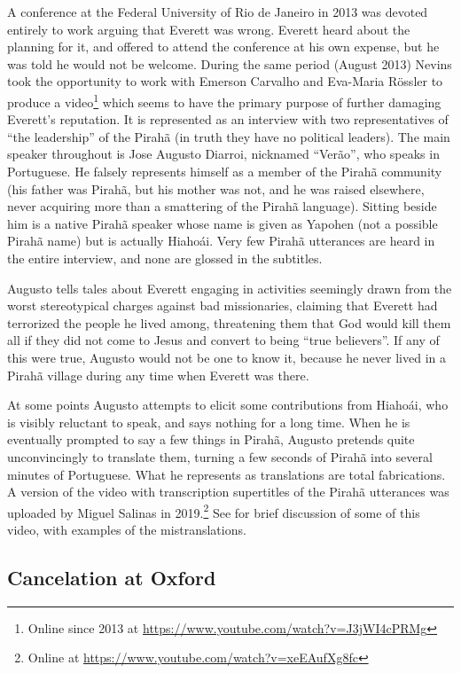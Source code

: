 \documentclass[output=paper,colorlinks,citecolor=brown
]{langscibook}
\begin{document}
A conference at the Federal University of Rio de Janeiro in 2013 was
devoted entirely to work arguing that Everett was wrong. Everett heard
about the planning for it, and offered to attend the conference at
his own expense, but he was told he would not be welcome. During the
same period (August 2013) Nevins took the opportunity to work with
Emerson Carvalho and Eva-Maria R{\"o}ssler to produce a video\footnote{%
   Online since 2013 at
   \url{https://www.youtube.com/watch?v=J3jWI4cPRMg}}
which seems to have the primary purpose of further damaging Everett's
reputation. It is represented as an interview with two representatives
of ``the leadership'' of the Pirahã (in truth they have no political
leaders). The main speaker throughout is Jose Augusto Diarroi, nicknamed
``Ver{ã}o'', who speaks in Portuguese. He falsely represents himself as a
member of the Pirahã community (his father was Pirahã, but
his mother was not, and he was raised elsewhere, never acquiring
more than a smattering of the Pirahã language). Sitting beside
him is a native Pirahã speaker whose name is given as Yapohen
(not a possible Pirahã name) but is actually Hiaho{\'a}i. Very
few Pirahã utterances are heard in the entire interview, and none
are glossed in the subtitles.

Augusto tells tales about Everett engaging in activities seemingly
drawn from the worst stereotypical charges against bad missionaries,
claiming that Everett had terrorized the people he lived among,
threatening them that God would kill them all if they did not come
to Jesus and convert to being ``true believers''. If any of this were
true, Augusto would not be one to know it, because he never lived in
a Pirahã village during any time when Everett was there.

At some points Augusto attempts to elicit some contributions from
Hiaho{\'a}i, who is visibly reluctant to speak, and says nothing for
a long time. When he is eventually prompted to say a few things in
Pirahã, Augusto pretends quite unconvincingly to translate them,
turning a few seconds of Pirahã into several minutes of Portuguese.
What he represents as translations are total fabrications. A version
of the video with transcription supertitles of the Pirahã utterances
was uploaded by Miguel Salinas in 2019.\footnote{%
   Online at \url{https://www.youtube.com/watch?v=xeEAufXg8fc}}
See \citet[781, fn.\,3]{EverGibs19} for brief
discussion of some of this video, with examples of the mistranslations.

\subsection{Cancelation at Oxford}
\label{sec-Oxford-cancelation}
\end{document}
